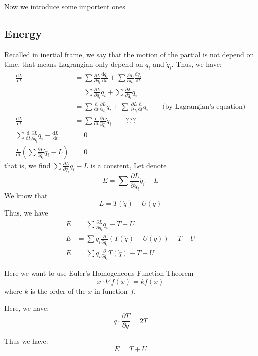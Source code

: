\documentclass{article}
\newcommand{\de}{\mathrm{d}}
\begin{document}
Now we introduce some importent ones
\subsection{Energy}
Recalled in inertial frame, we say that the motion of the partial is not depend on time, that means Lagrangian only depend on $q_i$ and $\dot q_i$.
Thus, we have:
\begin{align*}
    \frac{\de L}{\de t} &= \sum\frac{\partial L}{\partial q_i} \frac{\de q_i}{\de t} + \sum\frac{\partial L}{\partial \dot q_i} \frac{\de \dot q_i}{\de t} \\
    &=\sum\frac{\partial L}{\partial q_i}\dot q_i + \sum\frac{\partial L}{\partial \dot q_i}\ddot q_i \\
    &=\sum\frac{\de}{\de t} \frac{\partial L}{\partial \dot{q}_i} \dot q_i + \sum\frac{\partial L}{\partial \dot q_i}\frac{\de}{\de t} \dot q_i \qquad \text{(by Lagrangian's equation)} \\
    \frac{\de L}{\de t} &=\sum\frac{\de}{\de t} \frac{\partial L}{\partial \dot{q}_i} \dot q_i \qquad\text{???}\\
    \sum\frac{\de}{\de t} \frac{\partial L}{\partial \dot{q}_i} \dot q_i - \frac{\de L}{\de t} &= 0\\
    \frac{\de}{\de t} (\sum \frac{\partial L}{\partial \dot{q}_i} \dot q_i - L) &= 0
\end{align*}
that is, we find $\sum \frac{\partial L}{\partial \dot{q}_i} \dot q_i - L$ is a constent, Let denote
\[
E = \sum \frac{\partial L}{\partial \dot{q}_i} \dot q_i - L
\]
We know that 
\[
L = T(\dot q) - U(q)
\]
Thus, we have
\begin{align*}
    E &= \sum \frac{\partial L}{\partial \dot{q}_i} \dot q_i - T+U \\
    E &= \sum \dot q_i\frac{\partial }{\partial \dot{q}_i} (T(\dot q) - U(q))  - T+U \\
    E &= \sum \dot q_i\frac{\partial }{\partial \dot{q}_i} T(\dot q) - T+U
\end{align*}

Here we want to use Euler's Homogeneous Function Theorem
\[
x \cdot \nabla f(x) = kf(x)
\]
where $k$ is the order of the $x$ in function $f$.

Here, we have:
\[
\dot q \cdot \frac{\partial T}{\partial \dot q} = 2 T
\]

Thus we have:
\[
E = T+U
\]
\end{document}
